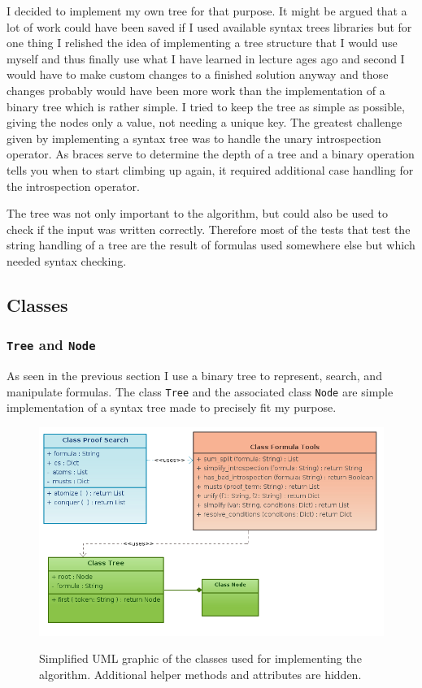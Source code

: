 I decided to implement my own tree for that purpose. It might be argued that a lot of work could have been saved if I used available syntax trees libraries but for one thing I relished the idea of implementing a tree structure that I would use myself and thus finally use what I have learned in lecture ages ago and second I would have to make custom changes to a finished solution anyway and those changes probably would have been more work than the implementation of a binary tree which is rather simple. I tried to keep the tree as simple as possible, giving the nodes only a value, not needing a unique key. The greatest challenge given by implementing a syntax tree was to handle the unary introspection operator. As braces serve to determine the depth of a tree and a binary operation tells you when to start climbing up again, it required additional case handling for the introspection operator. 

The tree was not only important to the algorithm, but could also be used to check if the input was written correctly. Therefore most of the tests that test the string handling of a tree are the result of formulas used somewhere else but which needed syntax checking. 

\subsection{Classes}

\subsubsection[Tree and Node]{\texttt{Tree} and \texttt{Node}}
As seen in the previous section I use a binary tree to represent, search, and manipulate formulas. The class \texttt{Tree} and the associated class \texttt{Node} are simple implementation of a syntax tree made to precisely fit my purpose. 

\begin{figure}[H]
	\caption{Simplified UML graphic of the classes used for implementing the algorithm. Additional helper methods and attributes are hidden.}
	\includegraphics[width=1\textwidth]{Figures/uml_j-logic.png}
	\label{uml}
\end{figure}


